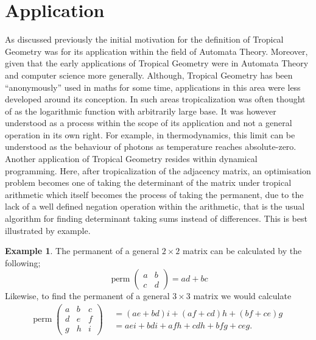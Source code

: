 \documentclass[12pt,a4paper]{amsart}
\theoremstyle{definition}
\newtheorem{ex}{Example}[section]
\theoremstyle{remark}
\begin{document}
\newpage
\section{Application}
As discussed previously the initial motivation for the definition of Tropical Geometry was for its application within the field of Automata Theory.
Moreover, given that the early applications of Tropical Geometry were in Automata Theory and computer science more generally.
Although, Tropical Geometry has been “anonymously” used in maths for some time, applications in this area were less developed around its conception. 
In such areas tropicalization was often thought of as the logarithmic function with arbitrarily large base. It was however understood as a process within the scope of its application and not a general operation in its own right.
For example, in thermodynamics, this limit can be understood as the behaviour of photons as temperature reaches absolute-zero.
Another application of Tropical Geometry resides within dynamical programming. Here, after tropicalization of the adjacency matrix, an optimisation problem becomes one of taking the determinant of the matrix under tropical arithmetic which itself becomes the process of taking the permanent, due to the lack of a well defined negation operation within the arithmetic, that is the usual algorithm for finding determinant taking sums instead of differences. This is best illustrated by example.

\begin{ex}
The permanent of a general $2\times2$ matrix can be calculated by the following;
\begin{equation}
\operatorname{perm}\begin{pmatrix}
a & b\\
c & d
\end{pmatrix} = ad + bc
\end{equation}
Likewise, to find the permanent of a general $3\times3$ matrix we would calculate
\begin{multline}
\operatorname{perm}\begin{pmatrix}
a & b & c\\
d & e & f\\
g & h & i
\end{pmatrix}
\begin{aligned}
    &= (a e+b d)i + (a f+c d)h + (b f+c e)g\\
    &= aei + bdi + afh + cdh + bfg + ceg.
\end{aligned}
\end{multline}
\end{ex}
\end{document}
